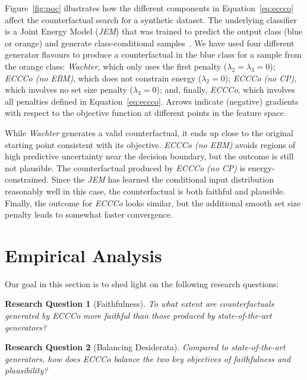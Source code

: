 \documentclass[letterpaper]{article} %
\newtheorem{question}{Research Question}[section]
\begin{document}
Figure~\ref{fig:poc} illustrates how the different components in Equation~\ref{eq:eccco} affect the counterfactual search for a synthetic dataset. The underlying classifier is a Joint Energy Model (\textit{JEM}) that was trained to predict the output class (blue or orange) and generate class-conditional samples~\citep{grathwohl2020your}. We have used four different generator flavours to produce a counterfactual in the blue class for a sample from the orange class: \textit{Wachter}, which only uses the first penalty ($\lambda_2=\lambda_3=0$); \textit{ECCCo (no EBM)}, which does not constrain energy ($\lambda_2=0$); \textit{ECCCo (no CP)}, which involves no set size penalty ($\lambda_3=0$); and, finally, \textit{ECCCo}, which involves all penalties defined in Equation~\ref{eq:eccco}. Arrows indicate (negative) gradients with respect to the objective function at different points in the feature space. 

While \textit{Wachter} generates a valid counterfactual, it ends up close to the original starting point consistent with its objective. \textit{ECCCo (no EBM)} avoids regions of high predictive uncertainty near the decision boundary, but the outcome is still not plausible. The counterfactual produced by \textit{ECCCo (no CP)} is energy-constrained. Since the \textit{JEM} has learned the conditional input distribution reasonably well in this case, the counterfactual is both faithful and plausible. Finally, the outcome for \textit{ECCCo} looks similar, but the additional smooth set size penalty leads to somewhat faster convergence. 

\section{Empirical Analysis}\label{emp}

Our goal in this section is to shed light on the following research questions:

\begin{question}[Faithfulness]\label{rq:faithfulness}
  To what extent are counterfactuals generated by \textit{ECCCo} more faithful than those produced by state-of-the-art generators?
\end{question}

\begin{question}[Balancing Desiderata]\label{rq:plausibility}
  Compared to state-of-the-art generators, how does \textit{ECCCo} balance the two key objectives of faithfulness and plausibility?
\end{question}
\end{document}
